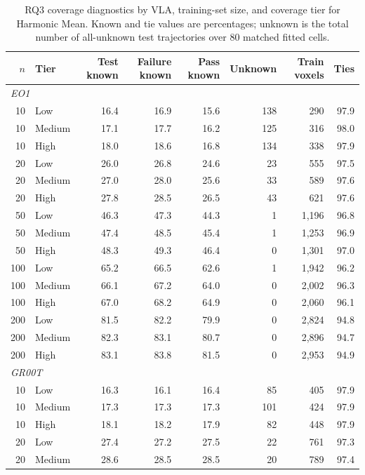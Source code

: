 \begin{table}[t]
\centering
\caption{RQ3 coverage diagnostics by VLA, training-set size, and coverage tier for Harmonic Mean. Known and tie values are percentages; unknown is the total number of all-unknown test trajectories over 80 matched fitted cells.}
\label{tab:rq3-supplementary-diagnostics}
{\scriptsize
\setlength{\tabcolsep}{4pt}
\begin{tabular}{rlrrrrrr}
\toprule
$n$ & Tier & Test known & Failure known & Pass known & Unknown & Train voxels & Ties \\
\midrule
\multicolumn{8}{l}{\textit{EO1}} \\
10 & Low & 16.4 & 16.9 & 15.6 & 138 & 290 & 97.9 \\
10 & Medium & 17.1 & 17.7 & 16.2 & 125 & 316 & 98.0 \\
10 & High & 18.0 & 18.6 & 16.8 & 134 & 338 & 97.9 \\
20 & Low & 26.0 & 26.8 & 24.6 & 23 & 555 & 97.5 \\
20 & Medium & 27.0 & 28.0 & 25.6 & 33 & 589 & 97.6 \\
20 & High & 27.8 & 28.5 & 26.5 & 43 & 621 & 97.6 \\
50 & Low & 46.3 & 47.3 & 44.3 & 1 & 1,196 & 96.8 \\
50 & Medium & 47.4 & 48.5 & 45.4 & 1 & 1,253 & 96.9 \\
50 & High & 48.3 & 49.3 & 46.4 & 0 & 1,301 & 97.0 \\
100 & Low & 65.2 & 66.5 & 62.6 & 1 & 1,942 & 96.2 \\
100 & Medium & 66.1 & 67.2 & 64.0 & 0 & 2,002 & 96.3 \\
100 & High & 67.0 & 68.2 & 64.9 & 0 & 2,060 & 96.1 \\
200 & Low & 81.5 & 82.2 & 79.9 & 0 & 2,824 & 94.8 \\
200 & Medium & 82.3 & 83.1 & 80.7 & 0 & 2,896 & 94.7 \\
200 & High & 83.1 & 83.8 & 81.5 & 0 & 2,953 & 94.9 \\
\midrule
\multicolumn{8}{l}{\textit{GR00T}} \\
10 & Low & 16.3 & 16.1 & 16.4 & 85 & 405 & 97.9 \\
10 & Medium & 17.3 & 17.3 & 17.3 & 101 & 424 & 97.9 \\
10 & High & 18.1 & 18.2 & 17.9 & 82 & 448 & 97.9 \\
20 & Low & 27.4 & 27.2 & 27.5 & 22 & 761 & 97.3 \\
20 & Medium & 28.6 & 28.5 & 28.5 & 20 & 789 & 97.4 \\

\end{tabular}}
\end{table}
